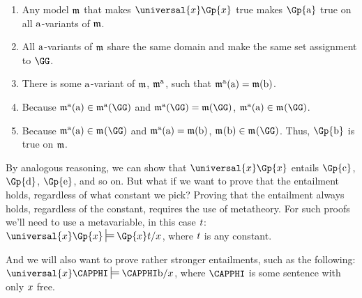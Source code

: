 \begin{enumerate}[label=(\roman*)]
	\item Any model $\mathfrak{m}$ that makes $\universal{\variable{x}}\Gp{\variable{x}}$ true makes $\Gp{\constant{a}}$ true on all $\mathrm{a}$-variants of $\mathfrak{m}$.
	\item All $\mathrm{a}$-variants of $\mathfrak{m}$ share the same domain and make the same set assignment to $\GG$.
	\item There is some $\mathrm{a}$-variant of $\mathfrak{m}$, $\mathfrak{m^{\mathrm{\mathrm{a}}}_{\mathrm{}}}$, such that $\mathfrak{m^{\mathrm{\mathrm{a}}}_{\mathrm{}}}(\mathrm{a})=\mathfrak{m}(\mathrm{b})$.
	\item Because $\As{\constant{a}}{}(\constant{a})\in\As{\constant{a}}{}(\GG)$ and $\As{\constant{a}}{}(\GG)=\IntA(\GG)$, $\As{\constant{a}}{}(\constant{a})\in\As{}{}(\GG)$.
	\item Because $\As{\constant{a}}{}(\constant{a})\in\As{}{}(\GG)$ and $\mathfrak{m^{\mathrm{\mathrm{a}}}_{\mathrm{}}}(\mathrm{a})=\mathfrak{m}(\mathrm{b})$, $\As{}{}(\constant{b})\in\As{}{}(\GG)$.
	Thus, $\Gp{\constant{b}}$ is true on $\mathfrak{m}$.
\end{enumerate}

\noindent{}By analogous reasoning, we can show that $\universal{\variable{x}}\Gp{\variable{x}}$ entails $\Gp{\constant{c}}$, $\Gp{\constant{d}}$, $\Gp{\constant{e}}$, and so on.  But what if we want to prove that the entailment holds, regardless of what constant we pick?  Proving that the entailment always holds, regardless of the constant, requires the use of metatheory.  For such proofs we'll need to use a metavariable, in this case $t$: $\universal{\variable{x}}\Gp{\variable{x}}\sdtstile{}{}\Gp{\variable{x}}\variable{t}/\variable{x}$, where $t$ is any constant.

And we will also want to prove rather stronger entailments, such as the following: $\universal{\variable{x}}\CAPPHI\sdtstile{}{}\CAPPHI\constant{b}/\variable{x}$, where $\CAPPHI$ is some \GQL{} sentence with only $x$ free.

